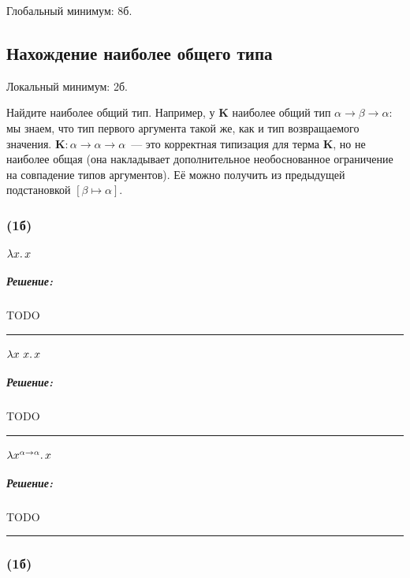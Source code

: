 \documentclass{article}
\newenvironment{proof}{\subparagraph{\hspace{-1em}Решение:\newline}}{\par\noindent\rule{\textwidth}{0.4pt}}
\newcommand{\term}[1]{\mathbf{#1}}
\newcommand{\subst}[3]{\left[#2 \mapsto #3 \right] #1}
\begin{document}
    Глобальный минимум: 8б.

    \subsection{Нахождение наиболее общего типа}

    Локальный минимум: 2б.

    Найдите наиболее общий тип.
    Например, у $\term{K}$ наиболее общий тип $\alpha \to \beta \to \alpha$: мы знаем, что тип первого аргумента такой же, как и тип возвращаемого значения.
    $\term{K} : \alpha \to \alpha \to \alpha$~--- это корректная типизация
    для терма $\term{K}$, но не наиболее общая (она накладывает дополнительное необоснованное ограничение на совпадение типов аргументов).
    Её можно получить из предыдущей подстановкой $\subst{}{\beta}{\alpha}$.

    \subsubsection{(1б)}

    \paragraph{} $\lambda x\ldotp x$

    \begin{proof}
        TODO %
    \end{proof}

    \paragraph{} $\lambda x~x\ldotp x$

    \begin{proof}
        TODO %
    \end{proof}

    \paragraph{} $\lambda x^{\alpha \to \alpha}\ldotp x$

    \begin{proof}
        TODO %
    \end{proof}

    \subsubsection{(1б)}
\end{document}
